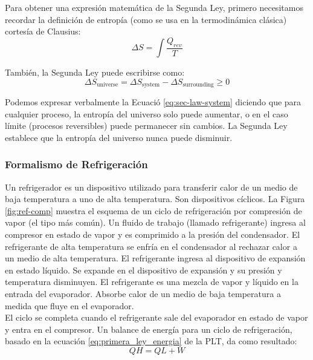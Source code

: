 Para obtener una expresión matemática de la Segunda Ley, primero necesitamos recordar la definición de entropía (como se usa en la termodinámica clásica) cortesía de Clausius:
\begin{equation}
	  \Delta S =\int \frac{Q_{rev}}{T}  
\end{equation}

También, la Segunda Ley puede escribirse como:
\begin{equation}\label{eq:sec-law-system}
  \Delta S_{\text{universe}} = \Delta S_{\text{system}} - \Delta S_{\text{surrounding}} \geq 0	
\end{equation}

Podemos expresar verbalmente la Ecuació \ref{eq:sec-law-system} diciendo que para cualquier proceso, la entropía del universo solo puede aumentar, o en el caso límite (procesos reversibles) puede permanecer sin cambios. La Segunda Ley establece que la entropía del universo nunca puede disminuir. \cite{james-2013}


\subsubsection{Formalismo de Refrigeración}

Un refrigerador es un dispositivo utilizado para transferir calor de un medio de baja temperatura a uno de alta temperatura. Son dispositivos cíclicos. La Figura \ref{fig:ref-comp} muestra el esquema de un ciclo de refrigeración por compresión de vapor (el tipo más común). Un fluido de trabajo (llamado refrigerante) ingresa al compresor en estado de vapor y es comprimido a la presión del condensador. El refrigerante de alta temperatura se enfría en el condensador al rechazar calor a un medio de alta temperatura. El refrigerante ingresa al dispositivo de expansión en estado líquido. Se expande en el dispositivo de expansión y su presión y temperatura disminuyen. El refrigerante es una mezcla de vapor y líquido en la entrada del evaporador. Absorbe calor de un medio de baja temperatura a medida que fluye en el evaporador. \cite{boles-2010}\\
El ciclo se completa cuando el refrigerante sale del evaporador en estado de vapor y entra en el compresor. 
Un balance de energía para un ciclo de refrigeración, basado en la ecuación \ref{eq:primera_ley_energia} de la PLT, da como resultado:
\begin{equation}
	QH = QL + W \label{eq:energy_balance}
\end{equation}

